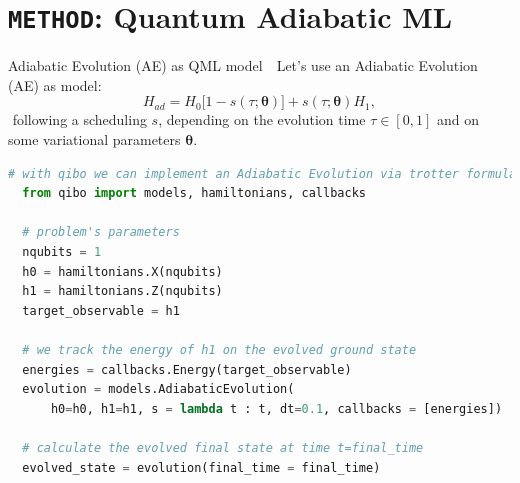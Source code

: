 \documentclass[8pt, xcolor={svgnames}, hyperref={colorlinks, linkcolor=black, citecolor=amethyst, urlcolor=amethyst}]{beamer}
\begin{document}
\section{\texttt{METHOD}: Quantum Adiabatic ML}

\begin{frame}[fragile]{Adiabatic Evolution (AE) as QML model}
\large
\faArrowCircleRight\,\, Let's use an Adiabatic Evolution (AE) as model:
\begin{equation}
    H_{ad} = H_0 \bigl[1 - s(\tau; \bm{\theta})\bigr] + s(\tau; \bm{\theta}) H_1,
    \label{eq:adiabatic_evolution}
\end{equation}
\faArrowCircleRight\,\,following a scheduling $s$, depending on the evolution time $\tau\in[0,1]$
and on some variational parameters $\bm{\theta}$.
\pause

\begin{tcolorbox}
\begin{lstlisting}[language=Python]
  # with qibo we can implement an Adiabatic Evolution via trotter formula
  from qibo import models, hamiltonians, callbacks

  # problem's parameters
  nqubits = 1
  h0 = hamiltonians.X(nqubits)
  h1 = hamiltonians.Z(nqubits)
  target_observable = h1

  # we track the energy of h1 on the evolved ground state
  energies = callbacks.Energy(target_observable)
  evolution = models.AdiabaticEvolution(
      h0=h0, h1=h1, s = lambda t : t, dt=0.1, callbacks = [energies])

  # calculate the evolved final state at time t=final_time
  evolved_state = evolution(final_time = final_time)
\end{lstlisting}
\end{tcolorbox}

\end{frame}
\end{document}

